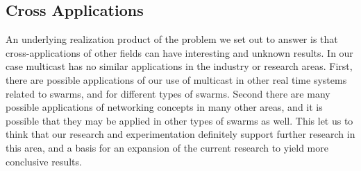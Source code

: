 \documentclass[journal]{IEEEtran}
\begin{document}
\subsection{Cross Applications}
An underlying realization product of the problem we set out to answer is that cross-applications of other fields can have interesting and unknown results. In our case multicast has no similar applications in the industry or research areas. First, there are possible applications of our use of multicast in other real time systems related to swarms, and for different types of swarms. Second there are many possible applications of networking concepts in many other areas, and it is possible that they may be applied in other types of swarms as well. 
This let us to think that our research and experimentation definitely support further research in this area, and a basis for an expansion of the current research to yield more conclusive results. 
\end{document}
